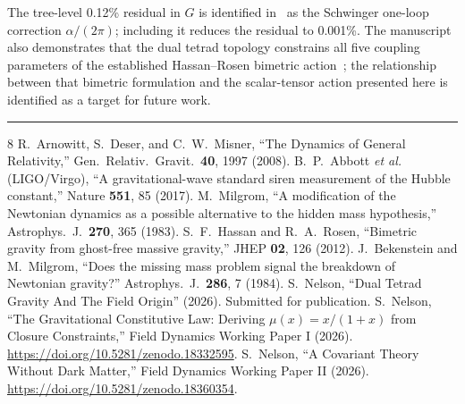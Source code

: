 \documentclass[11pt]{article}
\begin{document}
\noindent
The tree-level 0.12\% residual in $G$ is identified in~\cite{nelson2026main} as the Schwinger one-loop correction $\alpha/(2\pi)$; including it reduces the residual to 0.001\%. The manuscript~\cite{nelson2026main} also demonstrates that the dual tetrad topology constrains all five coupling parameters of the established Hassan--Rosen bimetric action~\cite{hassanrosen2012}; the relationship between that bimetric formulation and the scalar-tensor action presented here is identified as a target for future work.

\vspace{0.8cm}
\hrule
\vspace{0.5cm}

\begin{thebibliography}{8}
 R.~Arnowitt, S.~Deser, and C.~W.~Misner, ``The Dynamics of General Relativity,'' Gen.\ Relativ.\ Gravit.\ \textbf{40}, 1997 (2008).
 B.~P.~Abbott \textit{et al.} (LIGO/Virgo), ``A gravitational-wave standard siren measurement of the Hubble constant,'' Nature \textbf{551}, 85 (2017).
 M.~Milgrom, ``A modification of the Newtonian dynamics as a possible alternative to the hidden mass hypothesis,'' Astrophys.\ J.\ \textbf{270}, 365 (1983).
 S.~F.~Hassan and R.~A.~Rosen, ``Bimetric gravity from ghost-free massive gravity,'' JHEP \textbf{02}, 126 (2012).
 J.~Bekenstein and M.~Milgrom, ``Does the missing mass problem signal the breakdown of Newtonian gravity?'' Astrophys.\ J.\ \textbf{286}, 7 (1984).
 S.~Nelson, ``Dual Tetrad Gravity And The Field Origin'' (2026). Submitted for publication.
 S.~Nelson, ``The Gravitational Constitutive Law: Deriving $\mu(x) = x/(1+x)$ from Closure Constraints,'' Field Dynamics Working Paper I (2026). \url{https://doi.org/10.5281/zenodo.18332595}.
 S.~Nelson, ``A Covariant Theory Without Dark Matter,'' Field Dynamics Working Paper II (2026). \url{https://doi.org/10.5281/zenodo.18360354}.
\end{thebibliography}
\end{document}

